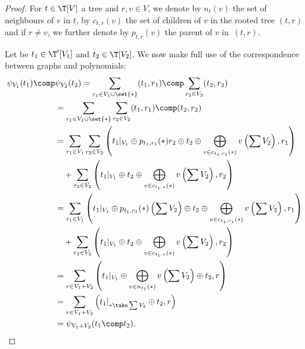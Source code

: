 \begin{proof}
    For $t\in \T[V]$ a tree and $r,v\in V$, we denote by $n_t(v)$ the set of neighbours of $v$ in $t$, by 
    $c_{t,r}(v)$ the set of children of $v$ in the rooted tree $(t,r)$ and if $r\not = v$, we further denote 
    by $p_{t,r}(v)$ the parent of $v$ in~$(t,r)$.

    Let be $t_1\in \T'[V_1]$ and $t_2\in \T[V_2]$. We now make full use of the correspondence between 
    graphs and polynomials:
    \begin{align}
        \psi_{V_1}(t_1)\comp &\psi_{V_2}(t_2) 
        = \sum_{r_1\in V_1\cup\set{\ast}} (t_1,r_1) \comp \sum_{r_2\in V_2}(t_2,r_2) \\ \nonumber
        &= \sum_{r_1\in V_1\cup\set{\ast}}\sum_{r_2\in V_2} (t_1,r_1)\comp (t_2,r_2) \\ \nonumber 
        &= \sum_{r_1\in V_1}\sum_{r_2\in V_2} \left(t_1|_{V_1}\oplus p_{t_1,r_1}(\ast)r_2
        \oplus t_2 \oplus \bigoplus_{v\in c_{t_1,r_1}(\ast)} v\left(\sum V_2\right), r_1\right) \\ \nonumber
        &\quad + \sum_{r_2\in V_2}\left(t_1|_{V_1}\oplus t_2 \oplus \bigoplus_{v\in c_{t_1,\ast}(\ast)} v\left(\sum V_2\right),r_2\right) \\ \nonumber
        &= \sum_{r_1\in V_1} \left(t_1|_{V_1}\oplus p_{t_1,r_1}(\ast)\left(\sum V_2\right) \oplus t_2 \oplus \bigoplus_{v\in c_{t_1,r_1}(\ast)}v\left(\sum V_2\right), r_1\right) \\ \nonumber
        &\quad+ \sum_{r_2\in V_2} \left(t_1|_{V_1}\oplus t_2 \oplus \bigoplus_{v\in c_{t_1,\ast}(\ast)} v\left(\sum V_2\right),r_2\right) \\ \nonumber
        &= \sum_{r\in V_1+V_2}\left(t_1|_{V_1}\oplus\bigoplus_{v\in n_{t_1}(\ast)}v\left(\sum V_2\right)\oplus t_2,r\right) \\ \nonumber
        &= \sum_{r\in V_1+V_2} \left(t_1|_{\ast \take \sum V_2}\oplus t_2,r\right) \\ \nonumber
        &= \psi_{V_1+V_2}(t_1\comp t_2). \qedhere
    \end{align}
\end{proof}


